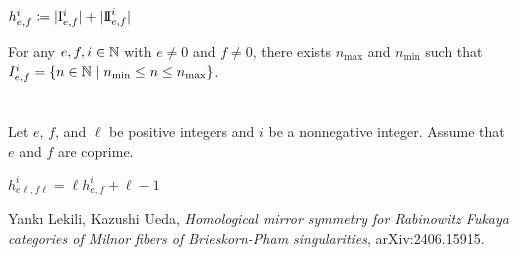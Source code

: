 \begin{definition}
\label{def:h}
\leanok
$
h_{e,f}^i
\coloneqq
|\mathrm{I}_{e,f}^i| + |\mathrm{I\!I}_{e,f}^i|
$
\end{definition}

\begin{lemma}
For any $e,f,i \in \mathbb{N}$ with $e \ne 0$ and $f \ne 0$,
there exists $n_{\max}$ and $n_{\min}$ such that
$I_{e,f}^i = \{n \in \mathbb{N} \mid n_{\min} \le n \le n_{\max}\}$.
\end{lemma}

\section{}

Let $e$, $f$, and $\ell$ be positive integers
and $i$ be a nonnegative integer.
Assume that $e$ and $f$ are coprime.

\begin{proposition}[{\cite[Proposition 5.1]{2406.15915}}]
\label{prop:main}
$
h_{e \ell, f \ell}^i = \ell h_{e,f}^i + \ell - 1
$
\end{proposition}

\begin{thebibliography}{LU}
Yank{\i} Lekili, Kazushi Ueda,
\emph{Homological mirror symmetry for Rabinowitz Fukaya categories
of Milnor fibers of Brieskorn-Pham singularities},
arXiv:2406.15915.
\end{thebibliography}